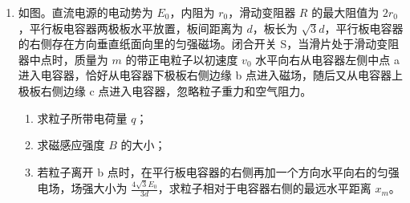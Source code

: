 \documentclass[\gkver]{gaokaozhenti}
\begin{document}
\begin{enumerate}

\item
如图。直流电源的电动势为 $E_{0}$，内阻为 $r_{0}$，滑动变阻器 $R$ 的最大阻值为 $2r_{0}$，平行板电容器两极板水平放置，板间距离为 $d$，板长为 $\sqrt{3}d$，平行板电容器的右侧存在方向垂直纸面向里的匀强磁场。闭合开关 S，当滑片处于滑动变阻器中点时，质量为 $m$ 的带正电粒子以初速度 $v_{0}$ 水平向右从电容器左侧中点 a 进入电容器，恰好从电容器下极板右侧边缘 b 点进入磁场，随后又从电容器上极板右侧边缘 c 点进入电容器，忽略粒子重力和空气阻力。
\begin{enumerate}
	\item
	求粒子所带电荷量 $q$；
	\item
	求磁感应强度 $B$ 的大小；
	\item
	若粒子离开 b 点时，在平行板电容器的右侧再加一个方向水平向右的匀强电场，场强大小为 $\frac{4\sqrt{3}E_{0}}{3d}$，求粒子相对于电容器右侧的最远水平距离 $x_{m}$。
\end{enumerate}

\end{enumerate}
\end{document}
